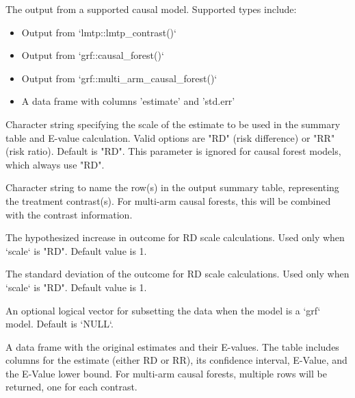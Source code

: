 \documentclass[a4paper]{book}
\begin{document}
%
\begin{Arguments}
\begin{ldescription}
\item[\code{model\_output}] The output from a supported causal model. Supported types include:
\begin{itemize}

\item{} Output from `lmtp::lmtp\_contrast()`
\item{} Output from `grf::causal\_forest()`
\item{} Output from `grf::multi\_arm\_causal\_forest()`
\item{} A data frame with columns 'estimate' and 'std.err'

\end{itemize}


\item[\code{scale}] Character string specifying the scale of the estimate to be used in the summary table and
E-value calculation. Valid options are "RD" (risk difference) or "RR" (risk ratio). Default is "RD".
This parameter is ignored for causal forest models, which always use "RD".

\item[\code{new\_name}] Character string to name the row(s) in the output summary table, representing the treatment
contrast(s). For multi-arm causal forests, this will be combined with the contrast information.

\item[\code{delta}] The hypothesized increase in outcome for RD scale calculations. Used only when `scale` is "RD".
Default value is 1.

\item[\code{sd}] The standard deviation of the outcome for RD scale calculations. Used only when `scale` is "RD".
Default value is 1.

\item[\code{subset}] An optional logical vector for subsetting the data when the model is a `grf` model. Default is `NULL`.
\end{ldescription}
\end{Arguments}
%
\begin{Value}
A data frame with the original estimates and their E-values. The table includes columns for the
estimate (either RD or RR), its confidence interval, E-Value, and the E-Value lower bound.
For multi-arm causal forests, multiple rows will be returned, one for each contrast.
\end{Value}
\end{document}
